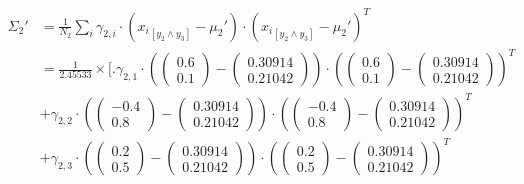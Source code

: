 \documentclass[12pt]{article}
\begin{document}
\begin{enumerate}[leftmargin=\labelsep]
          \begingroup
          \allowdisplaybreaks
          \begin{align*}
              \Sigma_2' & = \frac{1}{N_2} \sum_{i} \gamma_{2,i} \cdot \left({x_i}_{[y_2 \land y_3]} - \mu_2'\right) \cdot ({x_i}_{[y_2 \land y_3]} - \mu_2')^T \\
                        & = \frac{1}{2.45533} \times \Bigg[ \Bigg.
                            \gamma_{2,1} \cdot \left(\begin{pmatrix} 0.6 \\ 0.1 \end{pmatrix} - \begin{pmatrix} 0.30914 \\ 0.21042 \end{pmatrix}\right) \cdot \left(\begin{pmatrix} 0.6 \\ 0.1 \end{pmatrix} - \begin{pmatrix} 0.30914 \\ 0.21042 \end{pmatrix}\right)^T \\
                        & + \gamma_{2,2} \cdot \left(\begin{pmatrix} -0.4 \\ 0.8 \end{pmatrix} - \begin{pmatrix} 0.30914 \\ 0.21042 \end{pmatrix}\right) \cdot \left(\begin{pmatrix} -0.4 \\ 0.8 \end{pmatrix} - \begin{pmatrix} 0.30914 \\ 0.21042 \end{pmatrix}\right)^T \\
                        & + \gamma_{2,3} \cdot \left(\begin{pmatrix} 0.2 \\ 0.5 \end{pmatrix} - \begin{pmatrix} 0.30914 \\ 0.21042 \end{pmatrix}\right) \cdot \left(\begin{pmatrix} 0.2 \\ 0.5 \end{pmatrix} - \begin{pmatrix} 0.30914 \\ 0.21042 \end{pmatrix}\right)^T \\

\end{align*}
\end{enumerate}
\end{document}
